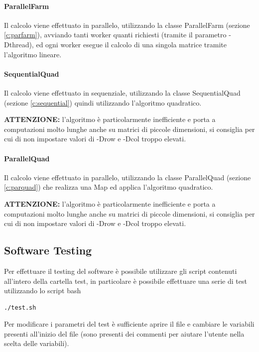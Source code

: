 \documentclass[a4paper,10pt]{article}
\begin{document}
\paragraph{ParallelFarm} Il calcolo viene effettuato in parallelo, utilizzando la classe \textsf{ParallelFarm} (sezione \ref{c:parfarm}), avviando tanti worker quanti richiesti (tramite il parametro \textsf{-Dthread}), ed ogni worker esegue il calcolo di una singola matrice tramite l'algoritmo lineare.

\paragraph{SequentialQuad} Il calcolo viene effettuato in sequenziale, utilizzando la classe \textsf{SequentialQuad} (sezione \ref{c:sequential}) quindi utilizzando l'algoritmo quadratico.

\textbf{ATTENZIONE:} l'algoritmo \`e particolarmente inefficiente e porta a computazioni molto lunghe anche su matrici di piccole dimensioni, si consiglia per cui di non impostare valori di \textsf{-Drow} e \textsf{-Dcol} troppo elevati.

\paragraph{ParallelQuad} Il calcolo viene effettuato in parallelo, utilizzando la classe \textsf{ParallelQuad} (sezione \ref{c:parquad}) che realizza una \textsf{Map} ed applica l'algoritmo quadratico.

\textbf{ATTENZIONE:} l'algoritmo \`e particolarmente inefficiente e porta a computazioni molto lunghe anche su matrici di piccole dimensioni, si consiglia per cui di non impostare valori di \textsf{-Drow} e \textsf{-Dcol} troppo elevati.

\subsection{Software Testing}

Per effettuare il testing del software \`e possibile utilizzare gli script contenuti all'intero della cartella \textsf{test}, in particolare \`e possibile effettuare una serie di test utilizzando lo script bash

\begin{lstlisting}
./test.sh
\end{lstlisting}

Per modificare i parametri del test \`e sufficiente aprire il file e cambiare le variabili presenti all'inizio del file (sono presenti dei commenti per aiutare l'utente nella scelta delle variabili).
\end{document}
